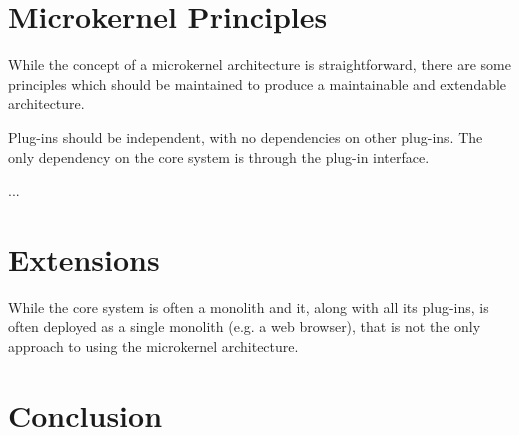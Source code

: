 \section{Microkernel Principles}
While the concept of a microkernel architecture is straightforward,
there are some principles which should be maintained to produce a maintainable and extendable architecture.

\begin{definition}
    Plug-ins should be independent, with no dependencies on other plug-ins.
    The only dependency on the core system is through the plug-in interface.
\end{definition}


\begin{definition}
    ...
\end{definition}




\section{Extensions}

While the core system is often a monolith and it, along with all its plug-ins, is often deployed as a single monolith
(e.g. a web browser), that is not the only approach to using the microkernel architecture.



\section{Conclusion}

